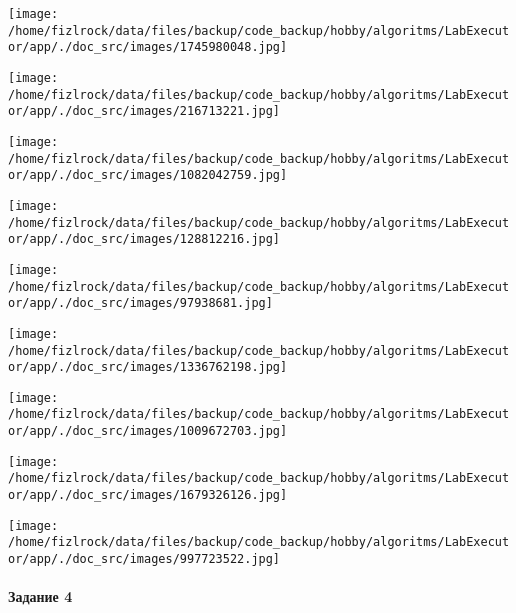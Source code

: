 \documentclass[a4paper, 12pt]{article}
\begin{document}
\texttt{[image: /home/fizlrock/data/files/backup/code\_backup/hobby/algoritms/LabExecutor/app/./doc\_src/images/1745980048.jpg]}

\texttt{[image: /home/fizlrock/data/files/backup/code\_backup/hobby/algoritms/LabExecutor/app/./doc\_src/images/216713221.jpg]}

\texttt{[image: /home/fizlrock/data/files/backup/code\_backup/hobby/algoritms/LabExecutor/app/./doc\_src/images/1082042759.jpg]}

\texttt{[image: /home/fizlrock/data/files/backup/code\_backup/hobby/algoritms/LabExecutor/app/./doc\_src/images/128812216.jpg]}

\texttt{[image: /home/fizlrock/data/files/backup/code\_backup/hobby/algoritms/LabExecutor/app/./doc\_src/images/97938681.jpg]}

\texttt{[image: /home/fizlrock/data/files/backup/code\_backup/hobby/algoritms/LabExecutor/app/./doc\_src/images/1336762198.jpg]}

\texttt{[image: /home/fizlrock/data/files/backup/code\_backup/hobby/algoritms/LabExecutor/app/./doc\_src/images/1009672703.jpg]}

\texttt{[image: /home/fizlrock/data/files/backup/code\_backup/hobby/algoritms/LabExecutor/app/./doc\_src/images/1679326126.jpg]}

\texttt{[image: /home/fizlrock/data/files/backup/code\_backup/hobby/algoritms/LabExecutor/app/./doc\_src/images/997723522.jpg]}
\pagebreak
\paragraph{Задание 4}
\end{document}

